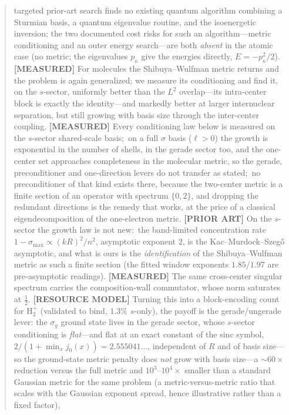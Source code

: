 \documentclass[aps,pra,twocolumn,superscriptaddress,longbibliography]{revtex4-2}
\begin{document}
\begin{abstract}
targeted prior-art search finds no existing quantum algorithm combining a
Sturmian basis, a quantum eigenvalue routine, and the isoenergetic inversion;
the two documented cost risks for such an algorithm---metric conditioning and an
outer energy search---are both \emph{absent} in the atomic case (no metric; the
eigenvalues $p_\kappa$ give the energies directly, $E=-p_\kappa^2/2$).  \textbf{[MEASURED]} For molecules the
Shibuya--Wulfman metric returns and the problem is again generalized; we measure
its conditioning and find it, on the $s$-sector, uniformly better than the $L^2$ overlap---its
intra-center block is exactly the identity---and markedly better at larger
internuclear separation, but still growing with basis size through the
inter-center coupling.  \textbf{[MEASURED]} Every conditioning law below is
measured on the $s$-sector shared-scale basis;\ on a full $\sigma$
basis ($\ell>0$) the growth is exponential in the number of shells, in the
gerade sector too, and the one-center set approaches completeness in the
molecular metric, so the gerade, preconditioner and one-direction levers do not
transfer as stated;\ no preconditioner of that kind exists there, because the
two-center metric is a finite section of an operator with spectrum
$\{0,2\}$, and dropping the redundant directions is the remedy that works, at
the price of a classical eigendecomposition of the one-electron metric.  \textbf{[PRIOR ART]} On the
$s$-sector the growth law is not new:\ the band-limited
concentration rate $1-\sigma_{\max}\propto(kR)^2/n^2$, asymptotic exponent
$2$, is the Kac--Murdock--Szeg\H{o} asymptotic, and what is ours is the
\emph{identification} of the Shibuya--Wulfman metric as such a finite section
(the fitted window exponents $1.85$/$1.97$ are pre-asymptotic readings).
\textbf{[MEASURED]} The same
cross-center singular spectrum carries the composition-wall commutator, whose
norm saturates at $\tfrac12$.  \textbf{[RESOURCE MODEL]} Turning this into a
block-encoding count for $\mathrm{H}_2^+$ (validated to bind, $1.3\%$ $s$-only), the
payoff is the gerade/ungerade lever: the $\sigma_g$ ground state lives in the gerade
sector, whose $s$-sector conditioning is \emph{flat}---and flat at an exact constant of the
sinc symbol, $2/(1+\min_x j_0(x))=2.555041\ldots$, independent of $R$ and of basis
size---so the ground-state metric
penalty does \emph{not} grow with basis size---a ${\sim}60\times$ reduction versus the full
metric and $10^3$--$10^4\times$ smaller than a standard Gaussian metric for the same problem (a metric-versus-metric ratio that scales with the Gaussian exponent spread, hence illustrative rather than a fixed factor),

\end{abstract}
\end{document}
